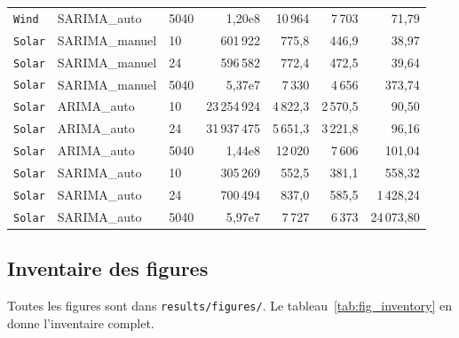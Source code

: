 {\begin{longtable}{lllrrrr}
\texttt{Wind} & SARIMA\_auto & 5040 & 1{,}20e8 & 10\,964 & 7\,703 & 71{,}79 \\
\texttt{Solar} & SARIMA\_manuel & 10 & 601\,922 & 775{,}8 & 446{,}9 & 38{,}97 \\
\texttt{Solar} & SARIMA\_manuel & 24 & 596\,582 & 772{,}4 & 472{,}5 & 39{,}64 \\
\texttt{Solar} & SARIMA\_manuel & 5040 & 5{,}37e7 & 7\,330 & 4\,656 & 373{,}74 \\
\texttt{Solar} & ARIMA\_auto & 10 & 23\,254\,924 & 4\,822{,}3 & 2\,570{,}5 & 90{,}50 \\
\texttt{Solar} & ARIMA\_auto & 24 & 31\,937\,475 & 5\,651{,}3 & 3\,221{,}8 & 96{,}16 \\
\texttt{Solar} & ARIMA\_auto & 5040 & 1{,}44e8 & 12\,020 & 7\,606 & 101{,}04 \\
\texttt{Solar} & SARIMA\_auto & 10 & 305\,269 & 552{,}5 & 381{,}1 & 558{,}32 \\
\texttt{Solar} & SARIMA\_auto & 24 & 700\,494 & 837{,}0 & 585{,}5 & 1\,428{,}24 \\
\texttt{Solar} & SARIMA\_auto & 5040 & 5{,}97e7 & 7\,727 & 6\,373 & 24\,073{,}80 \\
\end{longtable}
}

\subsection{Inventaire des figures}
Toutes les figures sont dans \texttt{results/figures/}. Le
tableau~\ref{tab:fig_inventory} en donne l'inventaire complet.

